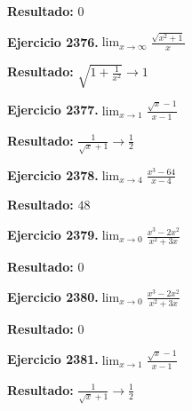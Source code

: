 \documentclass[10pt,a4paper]{article}
\begin{document}
\begin{solbox}
\textbf{Resultado:} \(\displaystyle 0\)
\end{solbox}

\begin{ejbox}
\textbf{Ejercicio 2376.}\quad $\lim_{x\to \infty} \frac{\sqrt{x^2+1}}{x}$
\end{ejbox}

\begin{solbox}
\textbf{Resultado:} \(\displaystyle \sqrt{1+\frac{1}{x^2}} \to 1\)
\end{solbox}

\begin{ejbox}
\textbf{Ejercicio 2377.}\quad $\lim_{x\to 1} \frac{\sqrt{x}-1}{x-1}$
\end{ejbox}

\begin{solbox}
\textbf{Resultado:} \(\displaystyle \frac{1}{\sqrt{x}+1} \to \frac{1}{2}\)
\end{solbox}

\newpage
\begin{ejbox}
\textbf{Ejercicio 2378.}\quad $\lim_{x\to 4} \frac{x^3-64}{x-4}$
\end{ejbox}

\begin{solbox}
\textbf{Resultado:} \(\displaystyle 48\)
\end{solbox}

\begin{ejbox}
\textbf{Ejercicio 2379.}\quad $\lim_{x\to 0} \frac{x^3-2x^2}{x^2+3x}$
\end{ejbox}

\begin{solbox}
\textbf{Resultado:} \(\displaystyle 0\)
\end{solbox}

\begin{ejbox}
\textbf{Ejercicio 2380.}\quad $\lim_{x\to 0} \frac{x^3-2x^2}{x^2+3x}$
\end{ejbox}

\begin{solbox}
\textbf{Resultado:} \(\displaystyle 0\)
\end{solbox}

\newpage
\begin{ejbox}
\textbf{Ejercicio 2381.}\quad $\lim_{x\to 1} \frac{\sqrt{x}-1}{x-1}$
\end{ejbox}

\begin{solbox}
\textbf{Resultado:} \(\displaystyle \frac{1}{\sqrt{x}+1} \to \frac{1}{2}\)
\end{solbox}
\end{document}
